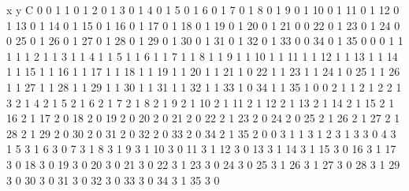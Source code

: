 x y C
0 0 1
1 0 1
2 0 1
3 0 1
4 0 1
5 0 1
6 0 1
7 0 1
8 0 1
9 0 1
10 0 1
11 0 1
12 0 1
13 0 1
14 0 1
15 0 1
16 0 1
17 0 1
18 0 1
19 0 1
20 0 1
21 0 0
22 0 1
23 0 1
24 0 0
25 0 1
26 0 1
27 0 1
28 0 1
29 0 1
30 0 1
31 0 1
32 0 1
33 0 0
34 0 1
35 0 0
0 1 1
1 1 1
2 1 1
3 1 1
4 1 1
5 1 1
6 1 1
7 1 1
8 1 1
9 1 1
10 1 1
11 1 1
12 1 1
13 1 1
14 1 1
15 1 1
16 1 1
17 1 1
18 1 1
19 1 1
20 1 1
21 1 0
22 1 1
23 1 1
24 1 0
25 1 1
26 1 1
27 1 1
28 1 1
29 1 1
30 1 1
31 1 1
32 1 1
33 1 0
34 1 1
35 1 0
0 2 1
1 2 1
2 2 1
3 2 1
4 2 1
5 2 1
6 2 1
7 2 1
8 2 1
9 2 1
10 2 1
11 2 1
12 2 1
13 2 1
14 2 1
15 2 1
16 2 1
17 2 0
18 2 0
19 2 0
20 2 0
21 2 0
22 2 1
23 2 0
24 2 0
25 2 1
26 2 1
27 2 1
28 2 1
29 2 0
30 2 0
31 2 0
32 2 0
33 2 0
34 2 1
35 2 0
0 3 1
1 3 1
2 3 1
3 3 0
4 3 1
5 3 1
6 3 0
7 3 1
8 3 1
9 3 1
10 3 0
11 3 1
12 3 0
13 3 1
14 3 1
15 3 0
16 3 1
17 3 0
18 3 0
19 3 0
20 3 0
21 3 0
22 3 1
23 3 0
24 3 0
25 3 1
26 3 1
27 3 0
28 3 1
29 3 0
30 3 0
31 3 0
32 3 0
33 3 0
34 3 1
35 3 0
